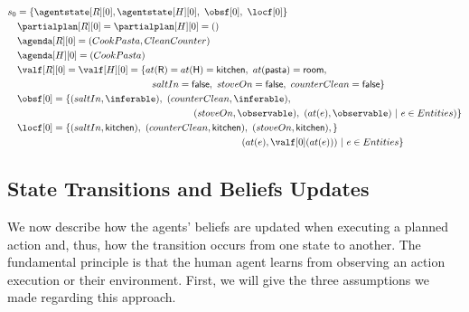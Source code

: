 
{\small
\noindent
\begin{align*}
&s_0 = \{\agentstate[R][0], \agentstate[H][0],~\obsf[0],~\locf[0]\} \\
&\quad \partialplan[R][0] = \partialplan[H][0] = ()\\
&\quad \agenda[R][0] = (CookPasta, CleanCounter)\\
&\quad \agenda[H][0] = (CookPasta)\\
&\quad \valf[R][0] = \valf[H][0] = \{at(\textsf{R}) = at(\textsf{H}) = \textsf{kitchen},~at(\textsf{pasta})=\textsf{room},\\
&\qquad \qquad \qquad \qquad \qquad \qquad \qquad \quad saltIn = \textsf{false},~stoveOn = \textsf{false},~counterClean = \textsf{false}\}\\
&\quad \obsf[0] = \{ (saltIn,\inferable),~(counterClean,\inferable),\\
&\qquad \qquad \qquad \qquad \qquad \qquad \qquad \qquad \qquad \quad \ (stoveOn,\observable),~(at(e),\observable) ~|~ e \in Entities)\}\\
&\quad \locf[0] = \{ (saltIn,\textsf{kitchen}),~(counterClean,\textsf{kitchen}),~(stoveOn,\textsf{kitchen}), \}\\
&\qquad \qquad \qquad \qquad \qquad \qquad \qquad \qquad \qquad \qquad \qquad \qquad \ (at(e),\valf[0](at(e))) ~|~ e \in Entities \}
\end{align*}

    \subsection{State Transitions and Beliefs Updates}

We now describe how the agents' beliefs are updated when executing a planned action and, thus, how the transition occurs from one state to another. The fundamental principle is that the human agent learns from observing an action execution or their environment. First, we will give the three assumptions we made regarding this approach.

}
